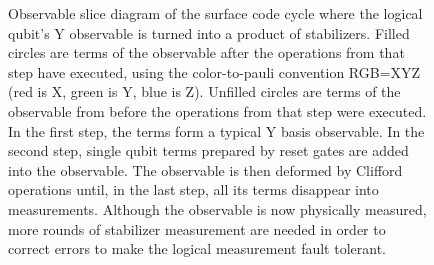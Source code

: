 \documentclass[onecolumn,unpublished,a4paper]{quantumarticle}
\theoremstyle{definition}
\theoremstyle{definition}
\theoremstyle{definition}
\begin{document}
\begin{figure}
    \centering
    \caption{
        Observable slice diagram of the surface code cycle where the logical qubit's Y observable is turned into a product of stabilizers.
        Filled circles are terms of the observable after the operations from that step have executed, using the color-to-pauli convention RGB=XYZ (red is X, green is Y, blue is Z).
        Unfilled circles are terms of the observable from before the operations from that step were executed.
        In the first step, the terms form a typical Y basis observable.
        In the second step, single qubit terms prepared by reset gates are added into the observable.
        The observable is then deformed by Clifford operations until, in the last step, all its terms disappear into measurements.
        Although the observable is now physically measured, more rounds of stabilizer measurement are needed in order to correct errors to make the logical measurement fault tolerant.
}
\end{figure}
\end{document}
